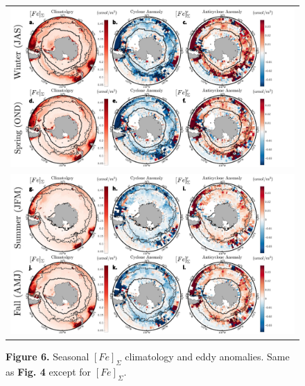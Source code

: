 \documentclass{article}
\begin{document}

\begin{figure}[!htbp]
 \begin{adjustwidth}{-1.2in}{-1.2in}
 \centering
  \begin{tabular}{c }
        \includegraphics[scale=.5]{Fig6a.pdf} \\
        \includegraphics[scale=.5]{Fig6b.pdf} \\
  \end{tabular}
 \end{adjustwidth}
\caption[Seasonal {$[Fe]_\Sigma$} climatology and eddy anomalies.] 
{\textbf{Figure 6.} Seasonal $[Fe]_\Sigma$ climatology and eddy anomalies. Same as \textbf{Fig. 4} except for $[Fe]_\Sigma$.
}
\label{fig:Fig7}
\end{figure}

\end{document}

